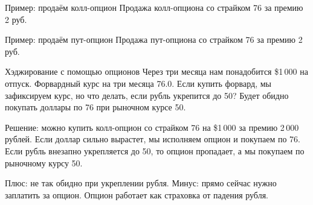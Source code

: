 \documentclass{beamer}
\begin{document}
\begin{frame}{Пример: продаём колл-опцион}
\justifying
Продажа колл-опциона со страйком 76 за премию 2 руб.

\justifying
\centering
\end{frame}



\begin{frame}{Пример: продаём пут-опцион}
\justifying
Продажа пут-опциона со страйком 76 за премию 2 руб.

\justifying
\centering
\end{frame}



\begin{frame}{Хэджирование с помощью опционов}
\justify
Через три месяца нам понадобится \$1\,000 на отпуск. Форвардный курс на три месяца 76.0. Если купить форвард, мы зафиксируем курс, но что делать, если рубль укрепится до 50? Будет обидно покупать доллары по 76 при рыночном курсе 50.

\justify
Решение: можно купить колл-опцион со страйком 76 на \$1\,000 за премию 2\,000 рублей. Если доллар сильно вырастет, мы исполняем опцион и покупаем по 76. Если рубль внезапно укрепляется до 50, то опцион пропадает, а мы покупаем по рыночному курсу 50.

\justify
Плюс: не так обидно при укреплении рубля. Минус: прямо сейчас нужно заплатить за опцион. Опцион работает как страховка от падения рубля.
\end{frame}
\end{document}
